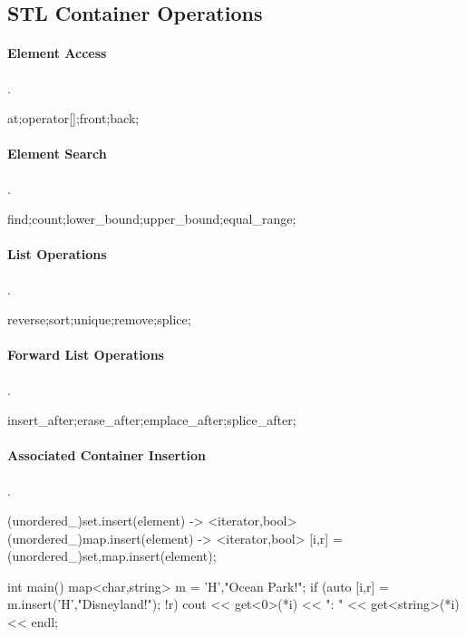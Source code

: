 \subsection*{STL Container Operations}
\paragraph{Element Access}{.}
\begin{code}
at;operator[];front;back;
\end{code}

\paragraph{Element Search}{.}
\begin{code}
find;count;lower_bound;upper_bound;equal_range;
\end{code}

\paragraph{List Operations}{.}
\begin{code}
reverse;sort;unique;remove;splice;
\end{code}

\paragraph{Forward List Operations}{.}
\begin{code}
insert_after;erase_after;emplace_after;splice_after;
\end{code}

\paragraph{Associated Container Insertion}{.}
\begin{code}
(unordered_)set.insert(element) -> <iterator,bool>
(unordered_)map.insert(element) -> <iterator,bool>
[i,r] = (unordered_){set,map}.insert(element);

int main()
{
  map<char,string> m = {{'H',"Ocean Park!"}};
  if (auto [i,r] = m.insert({'H',"Disneyland!"}); !r) {
    cout << get<0>(*i) << ": " << get<string>(*i) << endl;
  }
}

\end{code}

